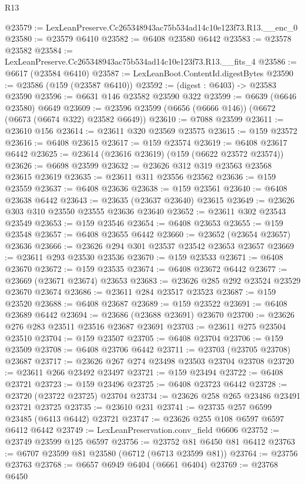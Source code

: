 \begin{lexlean}{R13}
\begin{coremodule}
@23579 := LexLeanPreserve.Cc265348943ac75b534ad14c10e123f73.R13.__enc_0
@23580 := @23579 @6410
@23582 := @6408 @23580 @6442
@23583 := @23578 @23582
@23584 := LexLeanPreserve.Cc265348943ac75b534ad14c10e123f73.R13.__fits_4
@23586 := @6617 (@23584 @6410)
@23587 := LexLeanBoot.ContentId.digestBytes
@23590 := @23586 (@159 (@23587 @6410))
@23592 := (digest : @6403) -> @23583 @23590
@23596 := @6631 @146 @23582 @23590 @322
@23599 := @6639 (@6646 @23580) @6649
@23609 := @23596 @23599 (@6656 (@6666 @146)) (@6672 (@6673 (@6674 @322) @23582 @6649))
@23610 := @7088 @23599
@23611 := @23610 @156
@23614 := @23611 @320 @23569 @23575
@23615 := @159 @23572
@23616 := @6408 @23615
@23617 := @159 @23574
@23619 := @6408 @23617 @6442
@23625 := @23614 (@23616 @23619) (@159 (@6622 @23572 @23574))
@23626 := @6698 @23599
@23632 := @23626 @312 @319 @23563 @23568 @23615 @23619
@23635 := @23611 @311 @23556 @23562
@23636 := @159 @23559
@23637 := @6408 @23636
@23638 := @159 @23561
@23640 := @6408 @23638 @6442
@23643 := @23635 (@23637 @23640) @23615
@23649 := @23626 @303 @310 @23550 @23555 @23636 @23640
@23652 := @23611 @302 @23543 @23549
@23653 := @159 @23546
@23654 := @6408 @23653
@23655 := @159 @23548
@23657 := @6408 @23655 @6442
@23660 := @23652 (@23654 @23657) @23636
@23666 := @23626 @294 @301 @23537 @23542 @23653 @23657
@23669 := @23611 @293 @23530 @23536
@23670 := @159 @23533
@23671 := @6408 @23670
@23672 := @159 @23535
@23674 := @6408 @23672 @6442
@23677 := @23669 (@23671 @23674) @23653
@23683 := @23626 @285 @292 @23524 @23529 @23670 @23674
@23686 := @23611 @284 @23517 @23523
@23687 := @159 @23520
@23688 := @6408 @23687
@23689 := @159 @23522
@23691 := @6408 @23689 @6442
@23694 := @23686 (@23688 @23691) @23670
@23700 := @23626 @276 @283 @23511 @23516 @23687 @23691
@23703 := @23611 @275 @23504 @23510
@23704 := @159 @23507
@23705 := @6408 @23704
@23706 := @159 @23509
@23708 := @6408 @23706 @6442
@23711 := @23703 (@23705 @23708) @23687
@23717 := @23626 @267 @274 @23498 @23503 @23704 @23708
@23720 := @23611 @266 @23492 @23497
@23721 := @159 @23494
@23722 := @6408 @23721
@23723 := @159 @23496
@23725 := @6408 @23723 @6442
@23728 := @23720 (@23722 @23725) @23704
@23734 := @23626 @258 @265 @23486 @23491 @23721 @23725
@23735 := @23610 @231
@23741 := @23735 @257 @6599 @23485 (@6413 @6442) @23721
@23747 := @23626 @255 @108 @6597 @6597 @6412 @6442
@23749 := LexLeanPreservation.conv_field @6606
@23752 := @23749 @23599 @125 @6597
@23756 := @23752 @81 @6450 @81 @6412
@23763 := @6707 @23599 @81 @23580 (@6712 (@6713 @23599 @81))
@23764 := @23756 @23763
@23768 := @6657 @6949 @6404 (@6661 @6404)
@23769 := @23768 @6450

\end{coremodule}
\end{lexlean}
